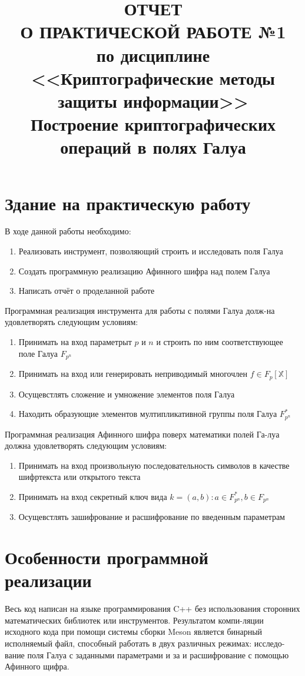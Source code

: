 \documentclass[a4paper]{article}
\title{
  ОТЧЕТ \\
  О ПРАКТИЧЕСКОЙ РАБОТЕ №1 \\
  по дисциплине <<Криптографические методы защиты информации>> \\
  Построение криптографических операций в полях Галуа
}
\begin{document}
  \templatedtitlepage
  
  \toc

  \section{Здание на практическую работу}
  В ходе данной работы необходимо:
  \begin{enumerate}
    \item Реализовать инструмент, позволяющий строить и исследовать поля Галуа
    \item Создать программную реализацию Афинного шифра над полем Галуа
    \item Написать отчёт о проделанной работе
  \end{enumerate}

  Программная реализация инструмента для работы с полями Галуа долж-на удовлетворять следующим условиям:
  \begin{enumerate}
    \item Принимать на вход параметрыт $p$ и $n$ и строить по ним соответствующее поле Галуа $F_{p^n}$ 
    \item Принимать на вход или генерировать неприводимый многочлен $f \in F_p\left[\mathbb{X}\right]$
    \item Осущевстлять сложение и умножение элементов поля Галуа
    \item Находить образующие элементов мултипликативной группы поля Галуа $F_{p^n}^*$
  \end{enumerate} 

  Программная реализация Афинного шифра поверх математики полей Га-луа должна удовлетворять следующим условиям:
  \begin{enumerate}
    \item Принимать на вход произвольную последовательность символов в качестве шифртекста или открытого текста
    \item Принимать на вход секретный ключ вида $k = (a, b): a \in F_{p^n}^*, b \in F_{p^n}$
    \item Осущевстлять зашифрование и расшифрование по введенным параметрам
  \end{enumerate}

  \newpage

  \section{Особенности программной реализации}

  Весь код написан на языке программирования C++ без использования сторонних
  математических библиотек или инструментов. Результатом компи-ляции исходного кода
  при помощи системы сборки Meson является бинарный исполняемый файл,
  способный работать в двух различных режимах: исследо-вание поля Галуа с заданными параметрами и за и расшифрование с помощью Афинного щифра.
\end{document}
